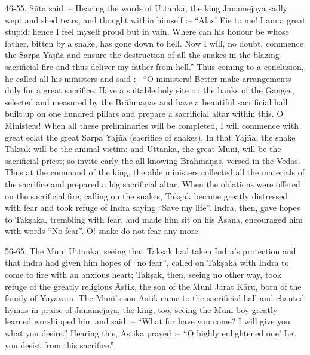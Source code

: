 46-55. S\=uta said :-- Hearing the words of Uttanka, the king Janamejaya sadly wept and shed tears, and thought within himself :-- ``Alas! Fie to me! I am a great stupid; hence I feel myself proud but in vain. Where can his honour be whose father, bitten by a snake, has gone down to hell. Now I will, no doubt, commence the Sarpa Yaj\~na and ensure the destruction of all the snakes in the blazing sacrificial fire and thus deliver my father from hell.'' Thus coming to a conclusion, he called all his ministers and said :-- ``O ministers! Better make arrangements duly for a great sacrifice. Have a suitable holy site on the banks of the Ganges, selected and measured by the Br\=ahma\d{n}as and have a beautiful sacrificial hall built up on one hundred pillars and prepare a sacrificial altar within this. O Ministers! When all these preliminaries will be completed, I will commence with great eclat the great Sarpa Yaj\~na (sacrifice of snakes). In that Yaj\~na, the snake Tak\d{s}ak will be the animal victim; and Uttanka, the great Muni, will be the sacrificial priest; so invite early the all-knowing Br\=ahma\d{n}as, versed in the Vedas. Thus at the command of the king, the able ministers collected all the materials of the sacrifice and prepared a big sacrificial altar. When the oblations were offered on the sacrificial fire, calling on the snakes, Tak\d{s}ak became greatly distressed with fear and took refuge of Indra saying ``Save my life''. Indra, then, gave hopes to Tak\d{s}aka, trembling with fear, and made him sit on his \=Asana, encouraged him with words ``No fear''. O! snake do not fear any more.

56-65. The Muni Uttanka, seeing that Tak\d{s}ak had taken Indra's protection and that Indra had given him hopes of ``no fear'', called on Tak\d{s}aka with Indra to come to fire with an anxious heart; Tak\d{s}ak, then, seeing no other way, took refuge of the greatly religious \=Astik, the son of the Muni Jarat K\=aru, born of the family of Y\=ay\=avara. The Muni's son \=Astik came to the sacrificial hall and chanted hymns in praise of Janamejaya; the king, too, seeing the Muni boy greatly learned worshipped him and said :-- ``What for have you come? I will give you what you desire.'' Hearing this, \=Astika prayed :-- ``O highly enlightened one! Let you desist from this sacrifice.''

